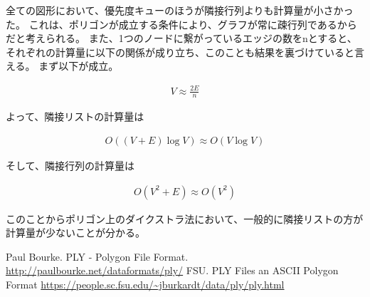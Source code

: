 \documentclass[a4paper,11pt]{jsarticle}
\begin{document}
全ての図形において、優先度キューのほうが隣接行列よりも計算量が小さかった。
これは、ポリゴンが成立する条件により、グラフが常に疎行列であるからだと考えられる。
また、1つのノードに繋がっているエッジの数をnとすると、それぞれの計算量に以下の関係が成り立ち、このことも結果を裏づけていると言える。
まず以下が成立。

\begin{align}
V \approx \frac{2E}{n}
\end{align}

よって、隣接リストの計算量は

\begin{align}
  O((V+E)\log V) \approx O(V \log V)
\end{align}

そして、隣接行列の計算量は

\begin{align}
  O(V^2+E) \approx O(V^2)
\end{align}

このことからポリゴン上のダイクストラ法において、一般的に隣接リストの方が計算量が少ないことが分かる。


\begin{thebibliography}{9}
   Paul Bourke. PLY - Polygon File Format. \url{http://paulbourke.net/dataformats/ply/}
   FSU. PLY Files an ASCII Polygon Format \url{https://people.sc.fsu.edu/~jburkardt/data/ply/ply.html}
\end{thebibliography}
\end{document}
